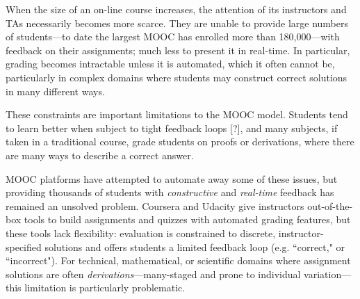 \documentclass{sigchi}
\begin{document}


When the size of an on-line course increases, the attention of its instructors and TAs necessarily becomes more scarce. They are unable to provide large numbers of students---to date the largest MOOC has enrolled more than 180,000---with feedback on their assignments; much less to present it in real-time. In particular, grading becomes intractable unless it is automated, which it often cannot be, particularly in complex domains where students may construct correct solutions in many different ways. 

These constraints are important limitations to the MOOC model. Students tend to learn better when subject to tight feedback loops [?], and many subjects, if taken in a traditional course, grade students on proofs or derivations, where there are many ways to describe a correct answer.

MOOC platforms have attempted to automate away some of these issues, but providing thousands of students with \textit{constructive} and \textit{real-time} feedback has remained an unsolved problem. Coursera and Udacity give instructors out-of-the-box tools to build assignments and quizzes with automated grading features, but these tools lack flexibility: evaluation is constrained to discrete, instructor-specified solutions and offers students a limited feedback loop (e.g. ``correct," or ``incorrect"). For technical, mathematical, or scientific domains where assignment solutions are often \textit{derivations}---many-staged and prone to individual variation---this limitation is particularly problematic.
\end{document}
